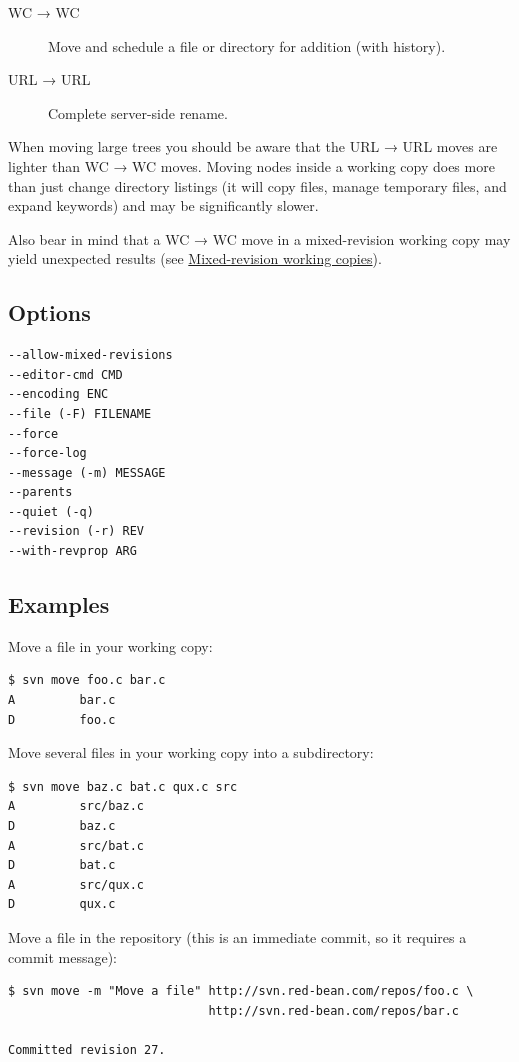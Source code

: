 \begin{description}
\item[WC → WC]
Move and schedule a file or directory for addition (with history).
\item[URL → URL]
Complete server-side rename.
\end{description}

When moving large trees you should be aware that the URL → URL moves are
lighter than WC → WC moves. Moving nodes inside a working copy does more
than just change directory listings (it will copy files, manage
temporary files, and expand keywords) and may be significantly slower.

Also bear in mind that a WC → WC move in a mixed-revision working copy
may yield unexpected results (see
\hyperref[svn.basic.in-action.mixedrevs]{Mixed-revision working
copies}).

\subsection{Options}

\begin{verbatim}
--allow-mixed-revisions
--editor-cmd CMD
--encoding ENC
--file (-F) FILENAME
--force
--force-log
--message (-m) MESSAGE
--parents
--quiet (-q)
--revision (-r) REV
--with-revprop ARG
\end{verbatim}

\subsection{Examples}

Move a file in your working copy:

\begin{verbatim}
$ svn move foo.c bar.c
A         bar.c
D         foo.c
\end{verbatim}

Move several files in your working copy into a subdirectory:

\begin{verbatim}
$ svn move baz.c bat.c qux.c src
A         src/baz.c
D         baz.c
A         src/bat.c
D         bat.c
A         src/qux.c
D         qux.c
\end{verbatim}

Move a file in the repository (this is an immediate commit, so it
requires a commit message):

\begin{verbatim}
$ svn move -m "Move a file" http://svn.red-bean.com/repos/foo.c \
                            http://svn.red-bean.com/repos/bar.c

Committed revision 27.
\end{verbatim}

